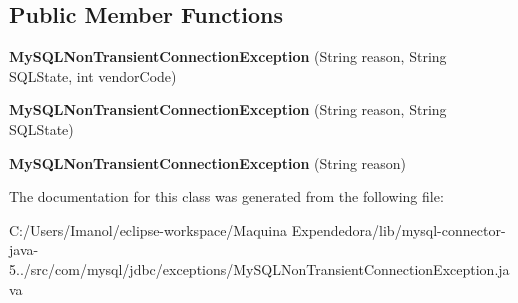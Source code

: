 \subsection*{Public Member Functions}
\begin{DoxyCompactItemize}
\item 
\mbox{\label{classcom_1_1mysql_1_1jdbc_1_1exceptions_1_1_my_s_q_l_non_transient_connection_exception_ab4243969fdc38dfc3b1db0ea5c201f65}} 
{\bfseries My\+S\+Q\+L\+Non\+Transient\+Connection\+Exception} (String reason, String S\+Q\+L\+State, int vendor\+Code)
\item 
\mbox{\label{classcom_1_1mysql_1_1jdbc_1_1exceptions_1_1_my_s_q_l_non_transient_connection_exception_a94bd9a1388eda6c5556cdb03bf1d43bb}} 
{\bfseries My\+S\+Q\+L\+Non\+Transient\+Connection\+Exception} (String reason, String S\+Q\+L\+State)
\item 
\mbox{\label{classcom_1_1mysql_1_1jdbc_1_1exceptions_1_1_my_s_q_l_non_transient_connection_exception_a7f841e1da11489ac4e204000213998fc}} 
{\bfseries My\+S\+Q\+L\+Non\+Transient\+Connection\+Exception} (String reason)
\end{DoxyCompactItemize}


The documentation for this class was generated from the following file\+:\begin{DoxyCompactItemize}
\item 
C\+:/\+Users/\+Imanol/eclipse-\/workspace/\+Maquina Expendedora/lib/mysql-\/connector-\/java-\/5../src/com/mysql/jdbc/exceptions/My\+S\+Q\+L\+Non\+Transient\+Connection\+Exception.\+java\end{DoxyCompactItemize}
